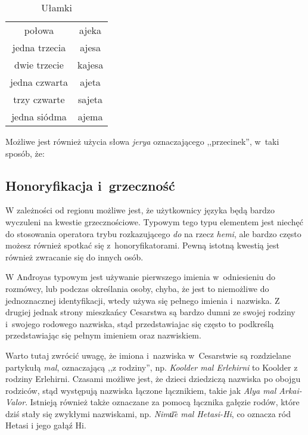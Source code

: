 \begin{spacing}{1.1}
\begin{table}[h]
	\centering
	\caption{Ułamki}
	\begin{tabular}{cc} \toprule
		połowa & ajeka \\
		jedna trzecia & ajesa \\
		dwie trzecie & kajesa \\
		jedna czwarta & ajeta \\
		trzy czwarte & sajeta \\
		jedna siódma & ajema  \\\bottomrule
	\end{tabular}
	\label{tab:chars}
\end{table}

Możliwe jest również użycia słowa \emph{jerya} oznaczającego ,,przecinek'', w~taki
sposób, że:


\subsection{Honoryfikacja i~grzeczność}

W zależności od regionu możliwe jest, że użytkownicy języka będą bardzo
wyczuleni na kwestie grzecznościowe. Typowym tego typu elementem jest niechęć
do stosowania operatora trybu rozkazującego \emph{do} na rzecz \emph{hemi},
ale bardzo często możesz również spotkać się z~honoryfikatorami. Pewną istotną
kwestią jest również zwracanie się do innych osób.

W And́royas typowym jest używanie pierwszego imienia w~odniesieniu do rozmówcy,
lub podczas określania osoby, chyba, że jest to niemożliwe do jednoznacznej 
identyfikacji, wtedy używa się pełnego imienia i~nazwiska. Z drugiej jednak strony
mieszkańcy Cesarstwa są bardzo dumni ze swojej rodziny i~swojego rodowego nazwiska, 
stąd przedstawiajac się często to podkreślą przedstawiając się pełnym imieniem
oraz nazwiskiem.


Warto tutaj zwrócić uwagę, że imiona i~nazwiska w~Cesarstwie są rozdzielane 
partykułą \emph{mal}, oznaczającą ,,z rodziny'', np. \emph{Koolder mal Erlehirni}
to Koolder z rodziny Erlehirni. Czasami możliwe jest, że dzieci dziedziczą 
nazwiska po obojgu rodziców, stąd występują nazwiska łączone łącznikiem, takie 
jak \emph{Alya mal Arkai-Valor}. Istnieją również także oznaczane za pomocą 
łącznika gałęzie rodów, które dziś stały się zwykłymi nazwiskami, np. 
\emph{Nimu͞e mal Hetasi-Hi}, co oznacza ród Hetasi i jego gałąź Hi.


\end{spacing}
